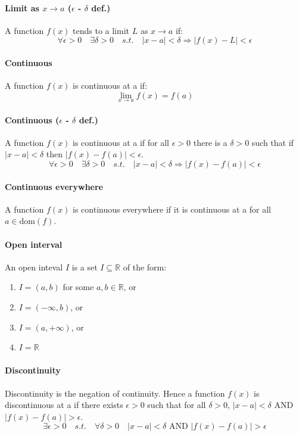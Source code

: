 \documentclass{article}
\newcommand{\R}{\mathbb{R}}
\begin{document}
\paragraph{Limit as $ x \to a $ ($ \epsilon $ - $ \delta $ def.)}
A function $ f(x) $ tends to a limit $ L $ as $ x \to a $ if:
\begin{equation}
\forall \epsilon > 0 \quad \exists \delta > 0 \quad s.t. \quad |x - a| < \delta \Rightarrow |f(x) - L| < \epsilon
\end{equation}
\paragraph{Continuous}
A function $ f(x) $ is continuous at a if:
\begin{equation}
\lim_{x \to a}f(x) = f(a)
\end{equation}
\paragraph{Continuous ($ \epsilon $ - $ \delta $ def.)}
A function $ f(x) $ is continuous at a if for all $ \epsilon > 0 $ there is a $ \delta > 0 $ such that if $ |x - a| < \delta $ then $ |f(x) - f(a)| < \epsilon $.
\begin{equation}
\forall \epsilon > 0 \quad \exists \delta > 0 \quad s.t. \quad |x - a| < \delta \Rightarrow |f(x) - f(a)| < \epsilon
\end{equation}
\paragraph{Continuous everywhere}
A function $ f(x) $ is continuous everywhere if it is continuous at a for all $ a \in \textrm{dom}(f) $.
\paragraph{Open interval}
An open inteval $ I $ is a set $ I \subseteq \R $ of the form:
\begin{enumerate}
\item $ I = (a, b) $ for some $ a, b \in \R $, or
\item $ I = (-\infty, b) $, or
\item $ I = (a, +\infty) $, or
\item $ I = \R $
\end{enumerate}
\paragraph{Discontinuity}
Discontinuity is the negation of continuity. Hence a function $ f(x) $ is discontinuous at a if there exists $ \epsilon > 0 $ such that for all $ \delta > 0 $, $ |x - a| < \delta $ AND $ |f(x) - f(a)| > \epsilon $.
\begin{equation}
\exists \epsilon > 0 \quad s.t. \quad \forall \delta > 0 \quad |x - a| < \delta \textrm{ AND } |f(x) - f(a)| > \epsilon
\end{equation}
\end{document}
